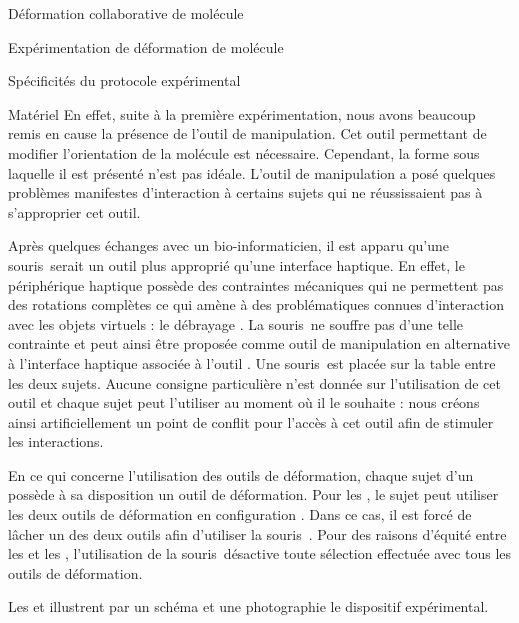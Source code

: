 \documentclass[myfrancais]{mythesis}
\begin{document}
\begin{mychapter}{Déformation collaborative de molécule}
\begin{mysection}{Expérimentation de déformation de molécule}
\begin{mysubsection}{Spécificités du protocole expérimental}
\begin{mysubsubsection}{Matériel}
					En effet, suite à la première expérimentation, nous avons beaucoup remis en cause la présence de l'outil de manipulation.
					Cet outil permettant de modifier l'orientation de la molécule est nécessaire.
					Cependant, la forme sous laquelle il est présenté n'est pas idéale.
					L'outil de manipulation  a posé quelques problèmes manifestes d'interaction à certains sujets qui ne réussissaient pas à s'approprier cet outil.

					Après quelques échanges avec un bio-informaticien, il est apparu qu'une souris~\myThreeD serait un outil plus approprié qu'une interface haptique.
					En effet, le périphérique haptique possède des contraintes mécaniques qui ne permettent pas des rotations complètes ce qui amène à des problématiques connues d'interaction avec les objets virtuels : le débrayage .
					La souris~\myThreeD ne souffre pas d'une telle contrainte et peut ainsi être proposée comme outil de manipulation en alternative à l'interface haptique associée à l'outil .
					Une souris~\myThreeD \mySpaceNavigator est placée sur la table entre les deux sujets.
					Aucune consigne particulière n'est donnée sur l'utilisation de cet outil et chaque sujet peut l'utiliser au moment où il le souhaite : nous créons ainsi artificiellement un point de conflit pour l'accès à cet outil afin de stimuler les interactions.

					En ce qui concerne l'utilisation des outils de déformation, chaque sujet d'un  possède à sa disposition un outil de déformation.
					Pour les , le sujet peut utiliser les deux outils de déformation en configuration .
					Dans ce cas, il est forcé de lâcher un des deux outils afin d'utiliser la souris~\myThreeD.
					Pour des raisons d'équité entre les  et les , l'utilisation de la souris~\myThreeD désactive toute sélection effectuée avec tous les outils de déformation.

					Les  et  illustrent par un schéma et une photographie le dispositif expérimental.


\end{mysubsubsection}
\end{mysubsection}
\end{mysection}
\end{mychapter}
\end{document}
